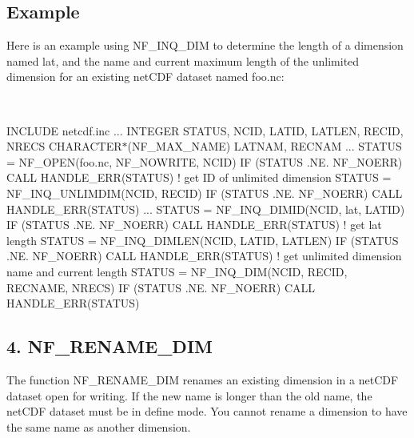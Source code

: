 \subsection*{Example }

Here is an example using N\+F\+\_\+\+I\+N\+Q\+\_\+\+D\+IM to determine the length of a dimension named lat, and the name and current maximum length of the unlimited dimension for an existing net\+C\+DF dataset named foo.\+nc\+:

 

I\+N\+C\+L\+U\+DE \textquotesingle{}netcdf.\+inc\textquotesingle{} ... I\+N\+T\+E\+G\+ER S\+T\+A\+T\+US, N\+C\+ID, L\+A\+T\+ID, L\+A\+T\+L\+EN, R\+E\+C\+ID, N\+R\+E\+CS C\+H\+A\+R\+A\+C\+T\+E\+R$\ast$(N\+F\+\_\+\+M\+A\+X\+\_\+\+N\+A\+ME) L\+A\+T\+N\+AM, R\+E\+C\+N\+AM ... S\+T\+A\+T\+US = N\+F\+\_\+\+O\+P\+EN(\textquotesingle{}foo.\+nc\textquotesingle{}, N\+F\+\_\+\+N\+O\+W\+R\+I\+TE, N\+C\+ID) IF (S\+T\+A\+T\+US .NE. N\+F\+\_\+\+N\+O\+E\+RR) C\+A\+LL H\+A\+N\+D\+L\+E\+\_\+\+E\+R\+R(\+S\+T\+A\+T\+U\+S) ! get ID of unlimited dimension S\+T\+A\+T\+US = N\+F\+\_\+\+I\+N\+Q\+\_\+\+U\+N\+L\+I\+M\+D\+I\+M(\+N\+C\+I\+D, R\+E\+C\+I\+D) IF (S\+T\+A\+T\+US .NE. N\+F\+\_\+\+N\+O\+E\+RR) C\+A\+LL H\+A\+N\+D\+L\+E\+\_\+\+E\+R\+R(\+S\+T\+A\+T\+U\+S) ... S\+T\+A\+T\+US = N\+F\+\_\+\+I\+N\+Q\+\_\+\+D\+I\+M\+ID(N\+C\+ID, \textquotesingle{}lat\textquotesingle{}, L\+A\+T\+ID) IF (S\+T\+A\+T\+US .NE. N\+F\+\_\+\+N\+O\+E\+RR) C\+A\+LL H\+A\+N\+D\+L\+E\+\_\+\+E\+R\+R(\+S\+T\+A\+T\+U\+S) ! get lat length S\+T\+A\+T\+US = N\+F\+\_\+\+I\+N\+Q\+\_\+\+D\+I\+M\+L\+E\+N(\+N\+C\+I\+D, L\+A\+T\+I\+D, L\+A\+T\+L\+E\+N) IF (S\+T\+A\+T\+US .NE. N\+F\+\_\+\+N\+O\+E\+RR) C\+A\+LL H\+A\+N\+D\+L\+E\+\_\+\+E\+R\+R(\+S\+T\+A\+T\+U\+S) ! get unlimited dimension name and current length S\+T\+A\+T\+US = N\+F\+\_\+\+I\+N\+Q\+\_\+\+D\+I\+M(\+N\+C\+I\+D, R\+E\+C\+I\+D, R\+E\+C\+N\+A\+M\+E, N\+R\+E\+C\+S) IF (S\+T\+A\+T\+US .NE. N\+F\+\_\+\+N\+O\+E\+RR) C\+A\+LL H\+A\+N\+D\+L\+E\+\_\+\+E\+R\+R(\+S\+T\+A\+T\+U\+S)\hypertarget{nc_f77_interface_guide_f77_NF-RENAME-DIM}{}\subsection{4. N\+F\+\_\+\+R\+E\+N\+A\+M\+E\+\_\+\+D\+I\+M }\label{nc_f77_interface_guide_f77_NF-RENAME-DIM}
The function N\+F\+\_\+\+R\+E\+N\+A\+M\+E\+\_\+\+D\+IM renames an existing dimension in a net\+C\+DF dataset open for writing. If the new name is longer than the old name, the net\+C\+DF dataset must be in define mode. You cannot rename a dimension to have the same name as another dimension.

